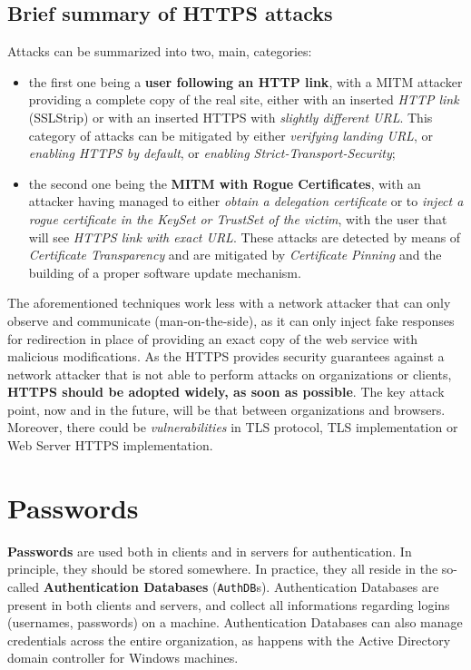 \documentclass[10pt]{\classname}
\begin{document}
\section{Brief summary of HTTPS attacks}

Attacks can be summarized into two, main, categories: 
\begin{itemize}
    \item the first one being a \textbf{user following an HTTP link},
        with a MITM attacker providing a complete copy of the real site, either
        with an inserted \emph{HTTP link} (SSLStrip) or with an inserted HTTPS with
        \emph{slightly different URL}. This category of attacks can be
        mitigated by either \emph{verifying landing URL}, or \emph{enabling
        HTTPS by default}, or \emph{enabling Strict\--Transport\--Security};
    \item the second one being the \textbf{MITM with Rogue Certificates}, with
        an attacker having managed to either \emph{obtain a delegation
        certificate} or to \emph{inject a rogue certificate in the KeySet or
        TrustSet of the victim}, with the user that will see \emph{HTTPS link with
        exact URL}. These attacks are detected by means of \emph{Certificate
        Transparency} and are mitigated by \emph{Certificate Pinning} and the
        building of a proper software update mechanism.
\end{itemize}

The aforementioned techniques work less with a network attacker that can only
observe and communicate (man\--on\--the\--side), as it can only inject fake
responses for redirection in place of providing an exact copy of the web
service with malicious modifications. As the HTTPS provides security guarantees
against a network attacker that is not able to perform attacks on organizations
or clients, \textbf{HTTPS should be adopted widely, as soon as possible}. The
key attack point, now and in the future, will be that between organizations and
browsers. Moreover, there could be \emph{vulnerabilities} in TLS protocol, TLS
implementation or Web Server HTTPS implementation.


\chapter{Passwords}

\textbf{Passwords} are used both in clients and in servers for authentication.
In principle, they should be stored somewhere. In practice, they all reside in
the so\--called \textbf{Authentication Databases} (\texttt{AuthDB}s).
Authentication Databases are present in both clients and servers, and collect
all informations regarding logins (usernames, passwords) on a machine.
Authentication Databases can also manage credentials across the entire
organization, as happens with the Active Directory domain controller for
Windows machines.
\end{document}
